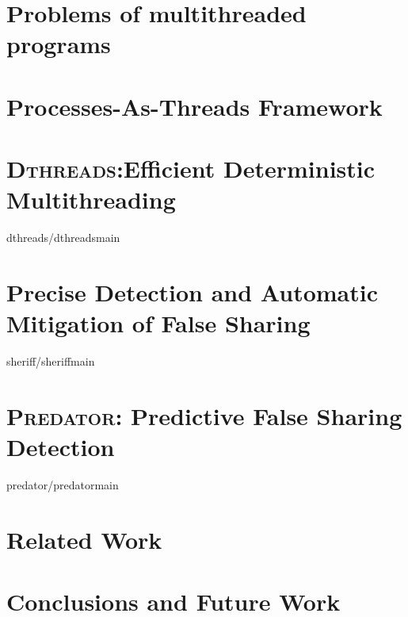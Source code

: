 \documentclass{umthesis}          %
\newcommand{\dthreads}{{\scshape Dthreads}}
\newcommand{\Predator}{\textsc{Predator}}
\newcommand{\DoubleTake}{\textsc{DoubleTake}}
\begin{document}
\tableofcontents                %
\listoffigures                  %


\mainmatter   %



\chapter{Problems of multithreaded programs}




\chapter{Processes-As-Threads Framework}


\chapter{\dthreads{}:Efficient Deterministic Multithreading}
 {dthreads/dthreadsmain}

\chapter{Precise Detection and Automatic Mitigation of False Sharing}
 {sheriff/sheriffmain}

\chapter{\Predator{}: Predictive False Sharing Detection}
 {predator/predatormain}

\chapter{Related Work}


\chapter{Conclusions and Future Work}


\backmatter  %




\end{document}
